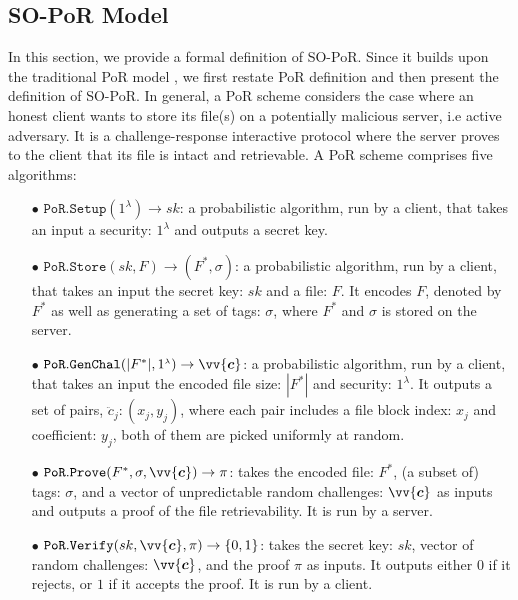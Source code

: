 



\subsection {SO-PoR Model}\label{SO-PoR-Model}
In this section, we provide a formal definition  of SO-PoR. Since it builds upon the traditional PoR model \cite{DBLP:conf/asiacrypt/ShachamW08}, we first restate PoR definition and then present the definition of SO-PoR. In general, a PoR scheme considers the case where an honest client wants to store its file(s) on a  potentially malicious server, i.e active adversary. It is a challenge-response interactive protocol where the server proves to the client that its file is intact and retrievable. A PoR scheme comprises five algorithms: 

\begin{itemize}
\item[$\bullet$] $\mathtt{PoR.Setup}(1^{\scriptscriptstyle\lambda})\rightarrow sk$:  a probabilistic algorithm, run by a client, that takes an input a security:  $1^{\scriptscriptstyle\lambda}$ and outputs a secret key.



\item[$\bullet$] $\mathtt{PoR.Store}(sk,F)\rightarrow (F^{*}, \sigma)$: a probabilistic algorithm, run by a client, that takes an input the secret key: $sk$ and a file: $F$. It encodes $F$, denoted by $F^{*}$ as well as generating a set of  tags: $\sigma$, where $F^{*}$ and  $\sigma$ is stored on the server.



\item[$\bullet$] $\mathtt{PoR.GenChal}(|F^{*}|, 1^{\scriptscriptstyle\lambda})\rightarrow \vv{\bm{c}}$: a probabilistic algorithm, run by a client, that takes an input the encoded file size: $|F^{*}|$ and security:  $1^{\scriptscriptstyle\lambda}$. It outputs a set of pairs, $\ddot{c}_{\scriptscriptstyle j}:(x_{\scriptscriptstyle j},y_{\scriptscriptstyle j})$, where each pair includes a file block index: $x_{\scriptscriptstyle j}$ and coefficient: $y_{\scriptscriptstyle j}$, both of them are picked uniformly at random.



\item[$\bullet$] $\mathtt{PoR.Prove}(F^{*}, \sigma, \vv{\bm{c}})\rightarrow \pi$:  takes the encoded file: $F^{*}$, (a subset of) tags: $\sigma$, and a vector of unpredictable random challenges: $\vv{\bm{c}}$ as inputs and outputs a proof of the file retrievability. It is run by a server.



\item[$\bullet$] $\mathtt{PoR.Verify}(sk,\vv{\bm{c}}, \pi)\rightarrow\{0,1\}$: takes the secret key: $sk$,  vector of random challenges: $\vv{\bm{c}}$, and the proof $\pi$ as inputs. It outputs either $0$ if it rejects,  or $1$ if it accepts the proof. It is run by a client.

\end{itemize}


